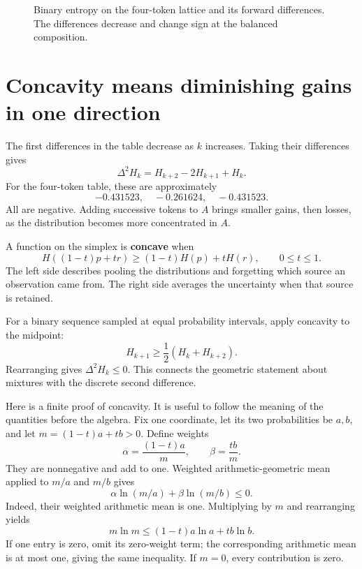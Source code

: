 \documentclass[11pt,oneside,openany]{book}
\theoremstyle{definition}
\theoremstyle{remark}
\numberwithin{equation}{chapter}
\begin{document}
\begin{figure}[htbp]\centering
{}
\caption{Binary entropy on the four-token lattice and its forward differences. The differences decrease and change sign at the balanced composition.}\end{figure}

\section{Concavity means diminishing gains in one direction}\label{ch05-concavity-means-diminishing-gains-in-one-direction}

The first differences in the table decrease as \(k\) increases. Taking their differences gives \[\Delta^2H_k=H_{k+2}-2H_{k+1}+H_k.\] For the four-token table, these are approximately \[-0.431523,\quad-0.261624,\quad-0.431523.\] All are negative. Adding successive tokens to \(A\) brings smaller gains, then losses, as the distribution becomes more concentrated in \(A\).

A function on the simplex is \textbf{concave} when \[H((1-t)p+tr)\geq(1-t)H(p)+tH(r),
\qquad 0\leq t\leq1.\] The left side describes pooling the distributions and forgetting which source an observation came from. The right side averages the uncertainty when that source is retained.

For a binary sequence sampled at equal probability intervals, apply concavity to the midpoint: \[H_{k+1}\geq\frac12(H_k+H_{k+2}).\] Rearranging gives \(\Delta^2H_k\leq0\). This connects the geometric statement about mixtures with the discrete second difference.

Here is a finite proof of concavity. It is useful to follow the meaning of the quantities before the algebra. Fix one coordinate, let its two probabilities be \(a,b\), and let \(m=(1-t)a+tb>0\). Define weights \[\alpha=\frac{(1-t)a}{m},\qquad \beta=\frac{tb}{m}.\] They are nonnegative and add to one. Weighted arithmetic-geometric mean applied to \(m/a\) and \(m/b\) gives \[\alpha\ln(m/a)+\beta\ln(m/b)\leq0.\] Indeed, their weighted arithmetic mean is one. Multiplying by \(m\) and rearranging yields \[m\ln m\leq(1-t)a\ln a+tb\ln b.\] If one entry is zero, omit its zero-weight term; the corresponding arithmetic mean is at most one, giving the same inequality. If \(m=0\), every contribution is zero.
\end{document}
